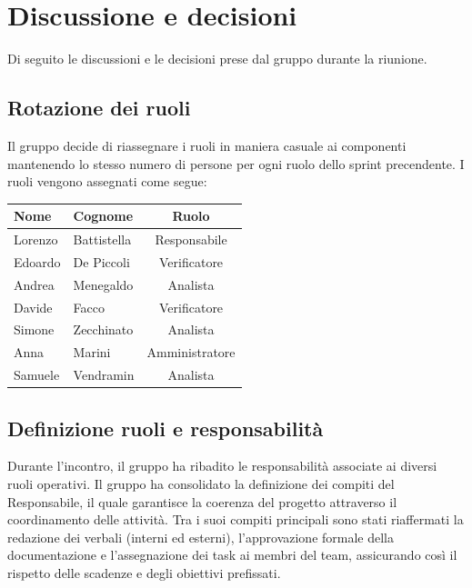 \documentclass[a4paper, 10pt, colorlinks=true, linkcolor=black, urlcolor=blue, citecolor=blue, hidelinks]{article}
\begin{document}
\section{Discussione e decisioni}
Di seguito le discussioni e le decisioni prese dal gruppo durante la riunione.
\subsection{Rotazione dei ruoli}
Il gruppo decide di riassegnare i ruoli in maniera casuale ai componenti mantenendo lo stesso numero di persone per ogni ruolo dello sprint precendente. I ruoli vengono assegnati come segue:
\begin{center}
    \begin{tabular}{|l|l|c|}
        \hline
        \textbf{Nome} & \textbf{Cognome} & \textbf{Ruolo} \\
        \hline
        Lorenzo & Battistella & Responsabile \\
        \hline
        Edoardo & De Piccoli & Verificatore \\
        \hline
        Andrea & Menegaldo & Analista \\
        \hline
        Davide & Facco & Verificatore \\ 
        \hline
        Simone & Zecchinato & Analista \\
        \hline
        Anna & Marini & Amministratore \\
        \hline
        Samuele & Vendramin & Analista \\       
        \hline  
    \end{tabular}
\end{center}

\subsection{Definizione ruoli e responsabilità}
Durante l'incontro, il gruppo ha ribadito le responsabilità associate ai diversi ruoli operativi. Il gruppo ha consolidato la definizione dei compiti del Responsabile, il quale garantisce la coerenza del progetto attraverso il coordinamento delle attività. Tra i suoi compiti principali sono stati riaffermati la redazione dei verbali (interni ed esterni), l'approvazione formale della documentazione e l'assegnazione dei task ai membri del team, assicurando così il rispetto delle scadenze e degli obiettivi prefissati.
\end{document}
